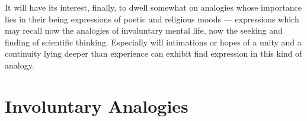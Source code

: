 \documentclass[12pt]{book}
\begin{document}
It will have its interest, finally, to dwell somewhat on analogies whose
importance lies in their being expressions of poetic and religious moods ---
expressions which may recall now the analogies of involuntary mental life, now
the seeking and finding of scientific thinking. Especially will intimations or
hopes of a unity and a continuity lying deeper than experience can exhibit find
expression in this kind of analogy.



\chapter{Involuntary Analogies}
\label{ch:1}
\end{document}
